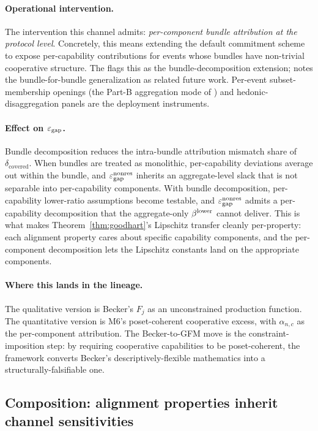 \paragraph{Operational intervention.}
The intervention this channel admits: \emph{per-component bundle
attribution at the protocol level}.  Concretely, this means
extending the default commitment scheme to expose per-capability
contributions for events whose bundles have non-trivial
cooperative structure.  The
\citep[Open~Question~2]{lasser2026paper8a} flags this as the
bundle-decomposition extension; \citep[Remark~5]{lasser2026paper8a}
notes the bundle-for-bundle generalization as related future work.
Per-event subset-membership openings (the Part-B aggregation
mode of \citep[Theorem~2]{lasser2026paper8a}) and
hedonic-disaggregation panels are the deployment instruments.

\paragraph{Effect on $\varepsilon_{\mathrm{gap}}$.}
Bundle decomposition reduces the intra-bundle attribution
mismatch share of $\delta_{\mathrm{covered}}$.  When bundles are
treated as monolithic, per-capability deviations average out
within the bundle, and $\varepsilon_{\mathrm{gap}}^{\mathrm{nonres}}$ inherits an aggregate-level
slack that is not separable into per-capability components.
With bundle decomposition, per-capability lower-ratio assumptions
become testable, and $\varepsilon_{\mathrm{gap}}^{\mathrm{nonres}}$ admits a per-capability
decomposition that the aggregate-only $\beta^{\mathrm{lower}}$ cannot deliver.
This is what makes Theorem~\ref{thm:goodhart}'s Lipschitz
transfer cleanly per-property: each alignment property cares about
specific capability components, and the per-component decomposition
lets the Lipschitz constants land on the appropriate components.

\paragraph{Where this lands in the lineage.}
The qualitative version is Becker's $F_j$ as an unconstrained
production function.  The quantitative version is M6's
poset-coherent cooperative excess, with $\alpha_{n,c}$ as the
per-component attribution.  The Becker-to-GFM move is the
constraint-imposition step: by requiring cooperative capabilities
to be poset-coherent, the framework converts Becker's
descriptively-flexible mathematics into a structurally-falsifiable
one.

\subsection{Composition: alignment properties inherit channel sensitivities}
\label{sec:channel_composition}

